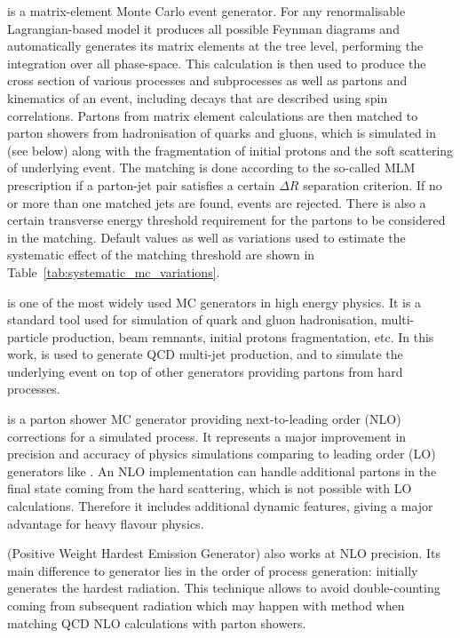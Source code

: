 \begin{description}[wide=\parindent, style=standard, labelsep=0pt]
\item [\MADGRAPH] \autocite{MadGraph} is a matrix-element Monte Carlo event generator. For any renormalisable
Lagrangian-based model it produces all possible Feynman diagrams and automatically generates its matrix elements at the
tree level, performing the integration over all phase-space. This calculation is then used to produce the cross section
of various processes and subprocesses as well as partons and kinematics of an event, including decays that are described
using spin correlations. Partons from matrix element calculations are then matched to parton showers from hadronisation
of quarks and gluons, which is simulated in \PYTHIA (see below) along with the fragmentation of initial protons and the
soft scattering of underlying event. The matching is done according to the so-called MLM prescription \autocite{MLM} if
a parton-jet pair satisfies a certain $\Delta R$ separation criterion. If no or more than one matched jets are found,
events are rejected. There is also a certain transverse energy threshold requirement for the partons to be considered in
the matching. Default values as well as variations used to estimate the systematic effect of the matching threshold are
shown in Table~\ref{tab:systematic_mc_variations}.

\item [\PYTHIA] \autocite{Pythia,Pythia6.4} is one of the most widely used MC generators in high energy physics. It is a
standard tool used for simulation of quark and gluon hadronisation, multi-particle production, beam remnants, initial
protons fragmentation, etc. In this work, \PYTHIA is used to generate QCD multi-jet production, and to simulate the
underlying event on top of other generators providing partons from hard processes.

\item [\MCATNLO] \autocite{MCatNLO} is a parton shower MC generator providing next-to-leading order (NLO) corrections
for a simulated process. It represents a major improvement in precision and accuracy of physics simulations comparing to
leading order (LO) generators like \PYTHIA. An NLO implementation can handle additional partons in the final state
coming from the hard scattering, which is not possible with LO calculations. Therefore it includes additional dynamic
features, giving a major advantage for heavy flavour physics.

\item [\POWHEG] (Positive Weight Hardest Emission Generator) \autocite{POWHEG} also works at NLO precision. Its main
difference to \MCATNLO generator lies in the order of process generation: \POWHEG initially generates the hardest
radiation. This technique allows to avoid double-counting coming from subsequent radiation which may happen with
\MCATNLO method when matching QCD NLO calculations with parton showers.

\end{description}

